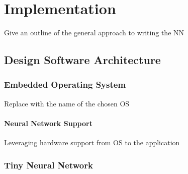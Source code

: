 \part{Implementation}

Give an outline of the general approach to writing the NN

\chapter[Design]{Design \linebreak[2]Software Architecture}

\section[Embedded Operating System]{Embedded Operating System}
Replace with the name of the chosen OS

\subsection{Neural Network Support}
Leveraging hardware support from OS to the application

\section{Tiny Neural Network}
